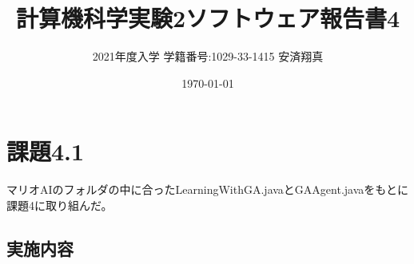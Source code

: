\documentclass[a4paper,11pt]{jsarticle}
\begin{document}
\title{計算機科学実験2ソフトウェア報告書4}
\author{2021年度入学 学籍番号:1029-33-1415 安済翔真}
\date{\today}
\maketitle

\section*{課題4.1}

マリオAIのフォルダの中に合ったLearningWithGA.javaとGAAgent.javaをもとに課題4に取り組んだ。

\subsection*{実施内容}
\end{document}
